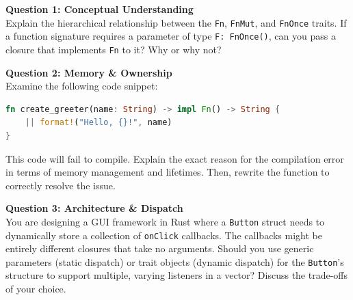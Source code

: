 \begin{exambox}
\textbf{Question 1: Conceptual Understanding} \\
Explain the hierarchical relationship between the \texttt{Fn}, \texttt{FnMut}, and \texttt{FnOnce} traits. If a function signature requires a parameter of type \texttt{F: FnOnce()}, can you pass a closure that implements \texttt{Fn} to it? Why or why not?

\vspace{1em}
\textbf{Question 2: Memory \& Ownership} \\
Examine the following code snippet:
\begin{lstlisting}[language=Rust]
fn create_greeter(name: String) -> impl Fn() -> String {
    || format!("Hello, {}!", name)
}
\end{lstlisting}
This code will fail to compile. Explain the exact reason for the compilation error in terms of memory management and lifetimes. Then, rewrite the function to correctly resolve the issue.

\vspace{1em}
\textbf{Question 3: Architecture \& Dispatch} \\
You are designing a GUI framework in Rust where a \texttt{Button} struct needs to dynamically store a collection of \texttt{onClick} callbacks. The callbacks might be entirely different closures that take no arguments. Should you use generic parameters (static dispatch) or trait objects (dynamic dispatch) for the \texttt{Button}'s structure to support multiple, varying listeners in a vector? Discuss the trade-offs of your choice.
\end{exambox}
